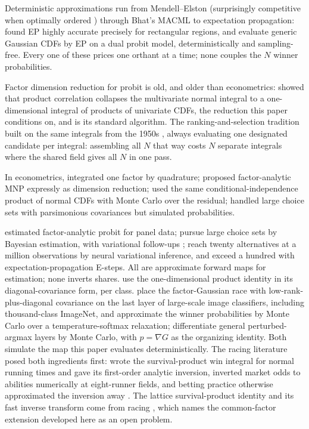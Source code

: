 \documentclass[12pt]{article}
\theoremstyle{remark}
\begin{document}
Deterministic approximations run from Mendell--Elston \citep{mendell1974}
(surprisingly competitive when optimally ordered \citep{connors2014})
through Bhat's MACML \citep{bhat2011} to expectation propagation:
\citet{cunningham2011} found EP
highly accurate precisely for rectangular regions, and \citet{fasano2025} evaluate generic Gaussian CDFs by EP on a dual probit
model, deterministically and sampling-free. Every one of these prices one
orthant at a time; none couples the $N$ winner probabilities.

Factor dimension reduction for probit is old, and older than
econometrics: \citet{curnow1962} showed that product correlation
collapses the multivariate normal integral to a one-dimensional integral
of products of univariate CDFs, the reduction this paper conditions on,
and \citet{dunnett1989} is its standard algorithm. The ranking-and-selection
tradition built on the same integrals from the 1950s
\citep{bechhofer1954,gupta1963}, always evaluating one designated
candidate per integral: assembling all $N$ that way costs $N$ separate
integrals where the shared field gives all $N$ in one pass.

In
econometrics, \citet{butler1982} integrated one factor by quadrature;
\citet{mcfadden1984} proposed factor-analytic MNP expressly as dimension
reduction; \citet{stern1992} used the same conditional-independence
product of normal CDFs with Monte Carlo over the residual;
\citet{bolduc1999} handled large choice sets with parsimonious
covariances but simulated probabilities.

\citet{elrod1995}
estimated factor-analytic probit for panel data;
\citet{loaiza2022} pursue large choice sets by
Bayesian estimation, with variational follow-ups \citep{loaiza2023};
\citet{kim2026} reach twenty alternatives at a million observations by
neural variational inference, and \citet{ding2024} exceed a hundred with
expectation-propagation E-steps. All are approximate forward maps for
estimation; none inverts shares. \citet{girolami2006} use the
one-dimensional product identity in its diagonal-covariance form,
per class. \citet{collier2021} place the factor-Gaussian race with
low-rank-plus-diagonal covariance on the last layer of large-scale image
classifiers, including thousand-class ImageNet, and approximate the
winner probabilities by Monte Carlo over a temperature-softmax
relaxation; \citet{berthet2020} differentiate general perturbed-argmax
layers by Monte Carlo, with $p = \nabla G$ as the organizing identity.
Both simulate the map this paper evaluates deterministically. The racing literature posed both
ingredients first: \citet{henery1981} wrote the survival-product win
integral for normal running times and gave its first-order analytic
inversion, \citet{ali1998} inverted market odds to abilities numerically
at eight-runner fields, and betting practice otherwise approximated the
inversion away \citep{lo1994}. The lattice survival-product identity and
its fast inverse transform come from racing \citep{cotton2021}, which
names the common-factor extension developed here as an open problem.
\end{document}
